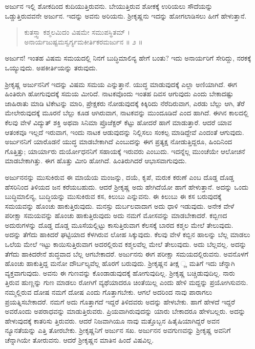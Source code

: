 ಅರ್ಜುನ ಇಲ್ಲಿ ಶೋಕದಿಂದ ಕುದಿಯುತ್ತಿರುವನು. ಬೇಯುತ್ತಿರುವ ಶೋಕಕ್ಕೆ ಉರಿಯಲು ಸೌದೆಯನ್ನು ಒಡ್ಡುತ್ತಿರುವವನೇ ಅರ್ಜುನ. ಇದನ್ನು ಅವನು ಅರಿಯನು. ಶ್ರೀಕೃಷ್ಣನು ಇದನ್ನು ಹೋಗಲಾಡಿಸಲು ಹೀಗೆ ಹೇಳುತ್ತಾನೆ.

\begin{verse}
ಕುತಸ್ತ್ವಾ ಕಶ್ಮಲಮಿದಂ ವಿಷಮೇ ಸಮುಪಸ್ಥಿತಮ್ ।\\ಅನಾರ್ಯಜುಷ್ಟಮಸ್ವರ್ಗ್ಯಮಕೀರ್ತಿಕರಮರ್ಜುನ \num{॥ ೨ ॥}
\end{verse}

{\small ಅರ್ಜುನ! ಇಂತಹ ವಿಷಮ ಸಮಯದಲ್ಲಿ ನಿನಗೆ ಬುದ್ಧಿಮಾಲಿನ್ಯ ಹೇಗೆ ಬಂತು? ಇದು ಅನಾರ್ಯರಿಗೆ ಸೇರಿದ್ದು, ನರಕಕ್ಕೆ ಒಯ್ಯುವುದು. ಅಪಕೀರ್ತಿಯನ್ನು ತರುವುದು.}

ಶ್ರೀಕೃಷ್ಣ ಅರ್ಜುನನಿಗೆ ಇದನ್ನು ವಿಷಮ ಸಮಯ ಎನ್ನುತ್ತಾನೆ. ಯುದ್ಧ ಮಾಡುವುದಕ್ಕೆ ಎಲ್ಲಾ ಅಣಿಯಾಗಿದೆ. ಈಗ ಹಿಂತಿರುಗಿ ಹೋಗುವುದಕ್ಕೆ ಸಮಯ ಮೀರಿದೆ. ನಾಟಕವೊಂದು ಇಂತಹ ದಿವಸ ಆಗುವುದು ಎಂದು ಬೇಕಾದಷ್ಟು ಜಾಹಿರಾತು ಮಾಡಿ ಟಿಕೇಟನ್ನು ಮಾರಿ, ಪ್ರೇಕ್ಷಕರು ನೋಡುವುದಕ್ಕೆ ಕಿಕ್ಕಿರಿದು ನೆರೆದಿರುವಾಗ, ಎರಡು ಬೆಲ್ಲು ಆಗಿ, ತೆರೆ ಮೇಲೇರುವುದಕ್ಕೆ ಮೂರನೆ ಬೆಲ್ಲು ಕೂಡ ಆಗಿರುವಾಗ, ನಾಟಕವನ್ನು ಮುಂದೂಡಿದೆ ಎಂದ ಹಾಗಿದೆ. ಈಗಿನ ಕಾಲದಲ್ಲಿ ಕೆಲವು ವೇಳೆ ವಿದ್ಯುತ್ ಶಕ್ತಿ ಅಥವಾ ಸಿನಿಮಾ ಪ್ರೊಜೆಕ್ಟರ್ ಕೆಟ್ಟು ಹೋದರೆ ಹಾಗೆ ಮಾಡುತ್ತಾರೆ. ಆದರೆ ಯಾವ ಆತಂಕವೂ ಇಲ್ಲದೆ ಇರುವಾಗ, ಇಂದು ನಾಟಕ ಆಡುವುದನ್ನು ನಿಲ್ಲಿಸಲು ಸಂಕಲ್ಪ ಮಾಡಿದ್ದೇವೆ ಎಂದಂತೆ ಆಗುವುದು. ಅರ್ಜುನನಿಗೆ ಯಾರೊಡನೆ ಯುದ್ಧ ಮಾಡಬೇಕಾಗಿದೆ ಎಂಬುದನ್ನು ಈಗ ಪ್ರತ್ಯಕ್ಷ ನೋಡುತ್ತಿದ್ದರೂ, ಹಿಂದಿನಿಂದ ಗೊತ್ತಿತ್ತು; ಯಾರ್ಯಾರು ದುರ್ಯೋಧನನಿಗೆ ಸಹಾಯಕ್ಕೆ ಇರುವರು ಎಂಬುದು. ಇದನ್ನೆಲ್ಲ ಮುಂಚೆಯೇ ಆಲೋಚನೆ ಮಾಡಬೇಕಾಗಿತ್ತು. ಈಗ ಹೊತ್ತು ಮೀರಿ ಹೋಗಿದೆ. ಹಿಂತಿರುಗಿದರೆ ಆಭಾಸವಾಗುವುದು.

ಅರ್ಜುನನನ್ನು ಮುಸುಕಿರುವ ಈ ಮಾಯೆಯ ಮಂಜನ್ನು, ದಯೆ, ಕೃಪೆ, ಮರುಕ ಕರುಣೆ ಎಂಬ ದೊಡ್ಡ ದೊಡ್ಡ ಹೆಸರಿನಿಂದ ತಿಳಿಯದ ಜನ ಕರೆಯಬಹುದು. ಆದರೆ ಶ್ರೀಕೃಷ್ಣ ಅದು ಹೇಗಿದೆಯೋ ಹಾಗೆ ಹೇಳುತ್ತಾನೆ. ಅದನ್ನು ಒಂದು ಬುದ್ಧಿಮಾಲಿನ್ಯ, ಬುದ್ಧಿಯನ್ನು ಮುಸುಕಿರುವ ಕಸ, ಕಿಲುಬು ಎನ್ನುವನು. ಈ ಕಿಲುಬು ಈ ಕಸ ಬರುವುದಕ್ಕೆ ಸಮಯವನ್ನು ಹೊಂಚು ಹಾಕುತ್ತಿರುವುದು. ಮನಸ್ಸು ದುರ್ಬಲವಾದಾಗ ಅದು ಧಾಳಿ ಇಡುವುದು. ಅನೇಕ ವೇಳೆ ಪರೀಕ್ಷಾ ಸಮಯವನ್ನು ಹೊಂಚು ಹಾಕುತ್ತಿರುವುದು ಅದು ನಮಗೆ ಮೋಸವನ್ನು ಮಾಡಬೇಕಾದರೆ. ಕಬ್ಬಿಣದ ಅದುರುಗಳನ್ನು ದೊಡ್ಡ ದೊಡ್ಡ ಮೂಸೆಯಲ್ಲಿಟ್ಟು ಕಾಸುತ್ತಿರುವಾಗ ಕೆಲಸಕ್ಕೆ ಬಾರದ ಕಶ್ಮಲ ಮೇಲೆ ತೇಲುವುದು. ಅದನ್ನು ತೆಗೆದು ಹಾಕಿದರೆ ಘಟ್ಟಿಯಾದ ಕೆಳಗಿರುವ ಲೋಹ ಸಿಕ್ಕುವುದು. ಕೆಲವು ವೇಳೆ ಕಬ್ಬಿನ ಹಾಲನ್ನು ಬೆಲ್ಲ ಮಾಡಲು ಒಲೆಯ ಮೇಲೆ ಇಟ್ಟು ಕಾಯಿಸುತ್ತಿರುವಾಗ ಅದರಲ್ಲಿರುವ ಕಶ್ಮಲವೆಲ್ಲ ಮೇಲೆ ತೇಲುವುದು. ಅದು ಬೆಲ್ಲವಲ್ಲ. ಅದನ್ನು ತೆಗೆದು ಹಾಕಿದರೇನೆ ಶುದ್ಧವಾದ ಬೆಲ್ಲ ಆಗಬೇಕಾದರೆ. ಅರ್ಜುನನು ಈಗ ಪರೀಕ್ಷಾ ಸಮಯದಲ್ಲಿರುವನು. ಅವನೊಳಗೆ ಹೊಂಚು ಹಾಕುತ್ತಿದ್ದ ಮನೋ ದೌರ್ಬಲ್ಯವೆಲ್ಲ ಹೊರಗೆ ಬರುವುದು. ಶ್ರೀಕೃಷ್ಣನ ತೀಕ್ಷ ್ಣ ಮತಿಗೆ ಇದು ಚೆನ್ನಾಗಿ ವ್ಯಕ್ತವಾಗುವುದು. ಅವನು ಈ ಗುಣವನ್ನು ಕೊಂಡಾಡುವುದಕ್ಕೆ ಹೋಗುವುದಿಲ್ಲ. ಶ್ರೀಕೃಷ್ಣ ಬಚ್ಚಿಡುವುದಿಲ್ಲ. ನಾರು ತ್ತಿರುವ ಹುಣ್ಣನ್ನು ಗುಣ ಮಾಡಲು ರೋಗಿಗೆ ವ್ಯಥೆಯಾದರೂ ಚಿಂತೆಯಿಲ್ಲ ಎಂದು ಹೇಳಿ ಮದ್ದನ್ನು ಪ್ರಯೋಗಿಸುವನು. ನಮ್ಮಲ್ಲಿರುವ ದೋಷ ನಮಗೆ ದೋಷ ಎಂದು ಗೊತ್ತಾಗಬೇಕು. ಆಗಲೆ ಅದರಿಂದ ನಾವು ಪಾರಾಗಲು ಪ್ರಯತ್ನಿಸಬೇಕಾದರೆ. ನಮಗೆ ಅದು ಗೊತ್ತಾಗದೆ ಇದ್ದರೆ ತಿಳಿದವರು ಅದನ್ನು ಹೇಳಬೇಕು. ಹಾಗೆ ಹೇಳದೆ ಇದ್ದರೆ ಅವರೊಂದು ಅಪರಾಧವನ್ನು ಮಾಡುತ್ತಿರುವರು. ಪ್ರಿಯವಾಗಿರುವುದನ್ನು ಯಾರು ಬೇಕಾದರೂ ಹೇಳಬಲ್ಲರು. ಅದನ್ನು ಹೇಳುವುದಕ್ಕೆ ಕಾತರಿಸು ತ್ತಿರುವರು. ಆದರೆ ನಿಜವಾಗಿಯೂ ನಾವು ಮತ್ತೊಬ್ಬನ ಹಿತೈಷಿಯಾಗಿದ್ದರೆ ಅವನ ನ್ಯೂನತೆಯನ್ನು ಎತ್ತಿ ತೋರಬೇಕು. ಶ್ರೀಕೃಷ್ಣನಿಗೆ ಅರ್ಜುನ ಸಖ. ಅರ್ಜುನನ ಅವಗುಣವನ್ನು ಶ್ರೀಕೃಷ್ಣ ಅವನಿಗೆ ಚೆನ್ನಾಗಿಯೇ ತೋರುವನು. ಆದರೆ ಶ್ರೀಕೃಷ್ಣನ ಮಾತಿನ ಹಿಂದೆ ವಿಷವಿಲ್ಲ.

